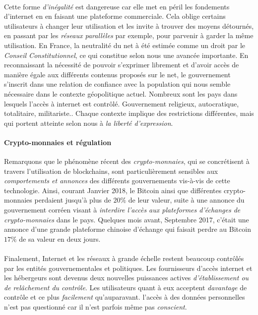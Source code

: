 \paragraph{} Cette forme \emph{d'inégalité} est dangereuse car elle met en péril les fondements d'internet
en en faisant une plateforme commerciale. Cela oblige certains utilisateurs à changer leur utilisation
et les invite à trouver des moyens détournés, en passant par les \emph{réseaux parallèles} par exemple, pour
parvenir à garder la même utilisation. En France, la neutralité du net à été estimée comme un droit par
le \emph{Conseil Constitutionnel}, ce qui constitue selon nous une avancée importante. En reconnaissant la
nécessité de pouvoir s'exprimer librement et d'avoir accès de manière égale aux différents contenus proposés
sur le net, le gouvernement s'inscrit dans une relation de confiance avec la population qui nous semble
nécessaire dans le contexte géopolitique actuel. Nombreux sont les pays dans lesquels l'accès à internet
est contrôlé. Gouvernement religieux, autocratique, totalitaire, militariste.. Chaque contexte implique
des restrictions différentes, mais qui portent atteinte selon nous à \emph{la liberté d'expression}.

\paragraph{Crypto-monnaies et régulation} Remarquons que le phénomène récent des \emph{crypto-monnaies}, qui
se concrétisent à travers l'utilisation de blockchains, sont particulièrement sensibles aux \emph{comportements
et annonces} des différents gouvernements vis-à-vis de cette technologie. Ainsi, courant Janvier 2018, le Bitcoin
ainsi que différentes crypto-monnaies perdaient jusqu'à plus de $20\%$ de leur valeur, suite à une annonce du 
gouvernement corréen visant à \emph{interdire l'accès aux plateformes d'échanges de crypto-monnaies} dans le pays.
\cite{CryptoMonnaies0} Quelques mois avant, Septembre 2017, c'était une annonce d'une grande plateforme chinoise
d'échange qui faisait perdre au Bitcoin $17\%$ de sa valeur en deux jours. \cite{CryptoMonnaies1}

\paragraph{} Finalement, Internet et les réseaux à grande échelle restent beaucoup contrôlés par les entités
gouvernementales et politiques. Les fournisseurs d'accès internet et les hébergeurs sont devenus deux 
nouvelles puissances actives \emph{d'établissement ou de relâchement du contrôle}. Les utilisateurs quant à eux
acceptent \emph{davantage} de contrôle et ce plus \emph{facilement} qu'auparavant. l'accès à des données personnelles
n'est pas questionné car il n'est parfois même pas \emph{conscient}.